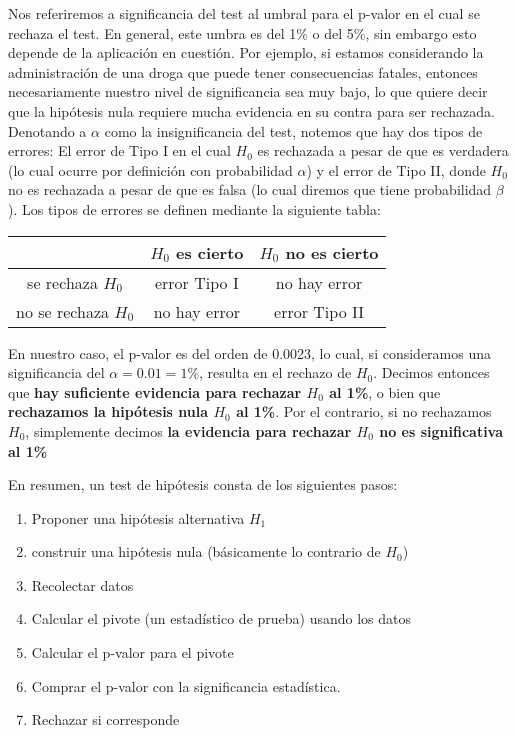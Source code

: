 \begin{remark} Nos referiremos a significancia del test al umbral para el p-valor en el cual se rechaza el test. En general, este umbra es del 1\% o del 5\%, sin embargo esto depende de la aplicación en cuestión. Por ejemplo, si estamos considerando la administración de una droga que puede tener consecuencias fatales, entonces necesariamente nuestro nivel de significancia sea muy bajo, lo que quiere decir que la hipótesis nula requiere mucha evidencia en su contra para ser rechazada. Denotando a $\alpha$ como la insignificancia del test, notemos que hay dos tipos de errores: El error de Tipo I en el cual $H_0$ es rechazada a pesar de que es verdadera (lo cual ocurre por definición con probabilidad $\alpha$) y el error de Tipo II, donde $H_0$ no es rechazada a pesar de que es falsa (lo cual diremos que tiene probabilidad $\beta$). Los tipos de errores se definen mediante la siguiente tabla:

\centering
\begin{tabular}{c|cc}
		  & $H_0$ es cierto & $H_0$ no es cierto  \\
		\hline
		se rechaza $H_0$  & error Tipo I  & no hay error    \\
		no se rechaza $H_0$  & no hay error   & error Tipo II
	\end{tabular}
\end{remark}

En nuestro caso, el p-valor es del orden de 0.0023, lo cual, si consideramos una significancia del $\alpha=0.01=1\%$, resulta en el rechazo de $H_0$. Decimos entonces que \textbf{ hay suficiente evidencia para rechazar $H_0$ al 1\%}, o bien que \textbf{ rechazamos la hipótesis nula $H_0$ al 1\%}. Por el contrario, si no rechazamos $H_0$, simplemente decimos \textbf{ la evidencia para rechazar $H_0$ no es significativa al 1\%}

En resumen,  un test de hipótesis consta de los siguientes pasos: 

\begin{enumerate}
	\item Proponer una hipótesis alternativa $H_1$
	\item construir una hipótesis nula (básicamente lo contrario de $H_0$)
	\item Recolectar datos
	\item Calcular el pivote (un estadístico de prueba) usando los datos
	\item Calcular el p-valor para el pivote
	\item Comprar el p-valor con la significancia estadística. 
	\item Rechazar si corresponde
\end{enumerate}

